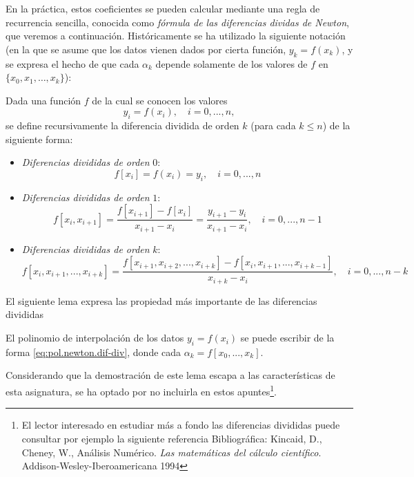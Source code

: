En la práctica, estos coeficientes se pueden calcular mediante una
regla de recurrencia sencilla, conocida como \textit{fórmula de las
  diferencias dividas de Newton}, que veremos a continuación.
Históricamente se ha utilizado la siguiente notación (en la que se
asume que los datos vienen dados por cierta función, $y_k=f(x_k)$, y
se expresa el hecho de que cada $\alpha_k$ depende solamente de los
valores de $f$ en $\{x_0,x_1,\dots,x_k\}$):
\begin{definition}
  Dada una función $f$ de la cual se conocen los valores
  $$
  y_i=f(x_i), \quad i=0,...,n,
  $$
  se define recursivamente la diferencia dividida de orden $k$ (para
  cada $k\le n$) de la siguiente forma:
  \begin{itemize}
  \item \textit{Diferencias divididas de orden} $0$:
    $$
    f[x_i]=f(x_i)=y_i,    \quad i=0,...,n
    $$
  \item \textit{Diferencias divididas de orden} $1$:
    $$
    f[x_i,x_{i+1}]=\frac{f[x_{i+1}]-f[x_i]}{x_{i+1}-x_i}=\frac{y_{i+1}-y_i}{x_{i+1}-x_i},
    \quad i=0,...,n-1
    $$
  \item \textit{Diferencias divididas de orden} $k$:
    $$
    f[x_i,x_{i+1},...,x_{i+k}] =
    \frac{f[x_{i+1},x_{i+2},...,x_{i+k}]-f[x_i,x_{i+1},...,x_{i+k-1}]} {x_{i+k}-x_i},
    \quad i=0,...,n-{k}
    $$
  \end{itemize}
\end{definition}


El siguiente lema expresa las propiedad más importante de las
diferencias divididas%
\begin{lemma}
  \label{lem:interpol1}
  El polinomio de interpolación de los datos $y_i=f(x_i)$ se puede
  escribir de la forma \ref{eq:pol.newton.dif-div},
  donde cada $\alpha_k=f[x_0,...,x_k]$.
\end{lemma}

Considerando que la demostración de este lema escapa a las características
de esta asignatura, se ha optado por no incluirla en estos
apuntes\footnote{El lector interesado en estudiar más a fondo las
  diferencias divididas puede consultar por ejemplo la siguiente
  referencia Bibliográfica: Kincaid, D., Cheney, W., Análisis
  Numérico. \textit{Las matemáticas del cálculo científico}.
  Addison-Wesley-Iberoamericana 1994}.

